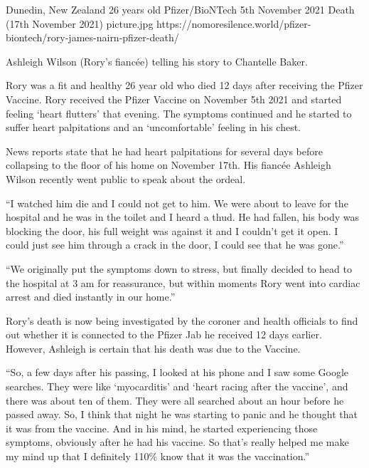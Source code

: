 {Dunedin, New Zealand}
{26 years old}
{Pfizer/BioNTech}
{5th November 2021}
{Death (17th November 2021)}
{picture.jpg}
{https://nomoresilence.world/pfizer-biontech/rory-james-nairn-pfizer-death/}
{

Ashleigh Wilson (Rory’s fiancée) telling his story to Chantelle Baker.

Rory was a fit and healthy 26 year old who died 12 days after receiving the
Pfizer Vaccine. Rory received the Pfizer Vaccine on November 5th 2021 and
started feeling ‘heart flutters’ that evening. The symptoms continued and he
started to suffer heart palpitations and an ‘uncomfortable’ feeling in his
chest.

News reports state that he had heart palpitations for several days before
collapsing to the floor of his home on November 17th. His fiancée Ashleigh
Wilson recently went public to speak about the ordeal.

“I watched him die and I could not get to him. We were about to leave for the
hospital and he was in the toilet and I heard a thud. He had fallen, his body
was blocking the door, his full weight was against it and I couldn’t get it
open. I could just see him through a crack in the door, I could see that he was
gone.”

“We originally put the symptoms down to stress, but finally decided to head to
the hospital at 3 am for reassurance, but within moments Rory went into cardiac
arrest and died instantly in our home.”

Rory’s death is now being investigated by the coroner and health officials to
find out whether it is connected to the Pfizer Jab he received 12 days
earlier. However, Ashleigh is certain that his death was due to the Vaccine.

“So, a few days after his passing, I looked at his phone and I saw some Google
searches. They were like ‘myocarditis’ and ‘heart racing after the vaccine’, and
there was about ten of them. They were all searched about an hour before he
passed away. So, I think that night he was starting to panic and he thought that
it was from the vaccine. And in his mind, he started experiencing those
symptoms, obviously after he had his vaccine. So that’s really helped me make my
mind up that I definitely 110\% know that it was the vaccination.”

}
